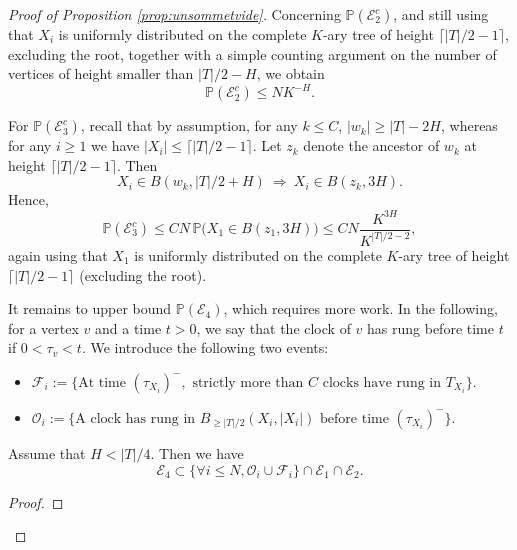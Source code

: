 \documentclass[10pt,a4paper]{amsart}
\newcommand{\Tf}{T}
\renewcommand{\P}{\mathbb{P}}
\begin{document}
\begin{proof}[Proof of Proposition \ref{prop:unsommetvide}]
Concerning $\P(\mathcal{E}_2^c)$, and still using that $X_i$ is uniformly distributed on the complete $K$-ary tree of height $\lceil |\Tf|/2-1 \rceil$, excluding the root, together with a simple counting argument on the number of vertices of height smaller than $|\Tf|/2-H$, we obtain
\begin{equation}\label{eq:E2}
\P(\mathcal{E}_2^c)\le N K^{-H}.
\end{equation}

For $\P(\mathcal{E}_3^c)$, recall that by assumption, for any $k\le C$, $|w_k|\ge |\Tf|-2H$, whereas for any $i\ge 1$ we have $|X_i|\le \lceil |\Tf|/2-1 \rceil$. Let $z_k$ denote the ancestor of $w_k$ at height $\lceil |\Tf|/2-1 \rceil$. Then
$$
X_i\in B(w_k,|\Tf|/2+H)\ \Longrightarrow\ X_i\in B(z_k,3H).
$$
Hence,
\begin{equation}\label{eq:E3}
\P(\mathcal{E}_3^c)
\le CN\,\P\bigl(X_1\in B(z_1,3H)\bigr)
\le CN \frac{K^{3H}}{K^{|\Tf|/2-2}},
\end{equation}
again using that $X_1$ is uniformly distributed on the complete $K$-ary tree of height $\lceil |\Tf|/2-1 \rceil$ (excluding the root).
\medskip


It remains to upper bound $\P(\mathcal{E}_4)$, which requires more work. In the following, for a vertex $v$ and a time $t>0$, we say that the clock of $v$ has rung before time $t$ if $0<\tau_v<t$. We introduce the following two events:
\begin{itemize}
\item[(i)] $\mathcal{F}_i := \{\text{At time } (\tau_{X_i})^{-}, \text{ strictly more than } C \text{ clocks have rung in } \Tf_{X_i}\}$.
\item[(ii)] $\mathcal{O}_i := \{\text{A clock has rung in } B_{\ge |\Tf|/2}(X_i, |X_i|) \text{ before time } (\tau_{X_i})^{-}\}$.
\end{itemize}



\begin{lemma} Assume that $H< |\Tf|/4$. Then
   we have $$\mathcal{E}_4\subset \{\forall i\le N, \mathcal{O}_i \cup \mathcal{F}_i\}\cap \mathcal{E}_1\cap \mathcal{E}_2.$$
\end{lemma}


\begin{proof}


\end{proof}
\end{proof}
\end{document}
